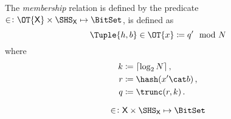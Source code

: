 \documentclass[ ../main.tex]{subfiles}
\begin{document}
%


The \emph{membership} relation is defined by the predicate $\SetContains \colon \OT{\Set{X}} \times \SHS_{\Set{X}} \mapsto \BitSet$, is defined as
\begin{equation}
\Tuple{h,b} \SetContains \OT{x} \coloneqq q' \mod N
\end{equation}
where
\begin{equation}
\begin{split}
k &\coloneqq \lceil \log_2 N \rceil\,,\\
r &\coloneqq \hash(x' \cat b)\,,\\
q &\coloneqq \trunc(r,k)\,.
\end{split}
\end{equation}



\begin{definition}
\begin{equation}
\SetContains \colon \Set{X} \times \SHS_{\Set{X}} \mapsto \BitSet
\end{equation}

\end{definition}
\end{document}

